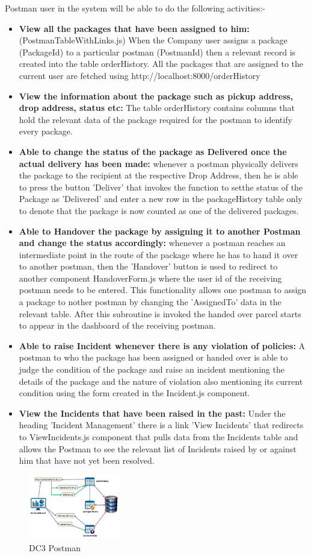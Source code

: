 Postman user in the system will be able to do the following activities:-
\begin{itemize}
\item {\textbf{View all the packages that have been assigned to him: }}(PostmanTableWithLinks.js) When the Company user assigns a package (PackageId) to a particular postman (PostmanId) then a relevant record is created into the table orderHistory. All the packages that are assigned to the current user are fetched using http://localhost:8000/orderHistory

\item \textbf{View the information about the package such as pickup address, drop address, status etc:} The table orderHistory contains columns that hold the relevant data of the package required for the postman to identify every package.
\item \textbf{Able to change the status of the package as Delivered once the actual delivery has been made:} whenever a postman physically delivers the package to the recipient at the respective Drop Address, then he is able to press the button 'Deliver' that invokes the function to setthe status of the Package as 'Delivered' and enter a new row in the packageHistory table only to denote that the package is now counted as one of the delivered packages.
\item \textbf{Able to Handover the package by assigning it to another Postman and change the status accordingly: }whenever a postman reaches an intermediate point in the route of the package where he has to hand it over to another postman, then the 'Handover' button is used to redirect to another component HandoverForm.js where the user id of the receiving postman needs to be entered. This functionality allows one postman to assign a package to nother postman by changing the 'AssignedTo' data in the relevant table. After this subroutine is invoked the handed over parcel  starts to appear in the dashboard of the receiving postman.
\item \textbf{Able to raise Incident whenever there is any violation of policies:} A postman to who the package has been assigned or handed over is able to judge the condition of the package and raise an incident mentioning the details of the package and the nature of violation also mentioning its current condition using the form created in the Incident.js component.
\item \textbf{View the Incidents that have been raised in the past: }Under the heading 'Incident Management' there is a link 'View Incidents' that redirects to ViewIncidents.js component that pulls data from the Incidents table and allows the Postman to see the relevant list of Incidents raised by or against him that have not yet been resolved.
\end{itemize}

\begin{figure}[htp]
    \centering
    \includegraphics[width=4cm]{images/snet/DC3 Postman.png}
    \caption{DC3 Postman}
    \label{fig:}
\end{figure}


